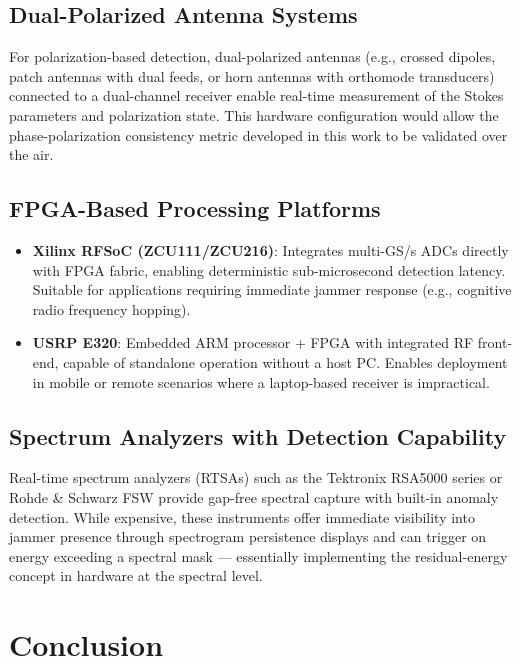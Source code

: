 \documentclass{article}
\begin{document}
\subsection{Dual-Polarized Antenna Systems}

For polarization-based detection, dual-polarized antennas (e.g., crossed dipoles, patch antennas with dual feeds, or horn antennas with orthomode transducers) connected to a dual-channel receiver enable real-time measurement of the Stokes parameters and polarization state. This hardware configuration would allow the phase-polarization consistency metric developed in this work to be validated over the air.

\subsection{FPGA-Based Processing Platforms}

\begin{itemize}
\item \textbf{Xilinx RFSoC (ZCU111/ZCU216)}: Integrates multi-GS/s ADCs directly with FPGA fabric, enabling deterministic sub-microsecond detection latency. Suitable for applications requiring immediate jammer response (e.g., cognitive radio frequency hopping).

\item \textbf{USRP E320}: Embedded ARM processor + FPGA with integrated RF front-end, capable of standalone operation without a host PC. Enables deployment in mobile or remote scenarios where a laptop-based receiver is impractical.
\end{itemize}

\subsection{Spectrum Analyzers with Detection Capability}

Real-time spectrum analyzers (RTSAs) such as the Tektronix RSA5000 series or Rohde \& Schwarz FSW provide gap-free spectral capture with built-in anomaly detection. While expensive, these instruments offer immediate visibility into jammer presence through spectrogram persistence displays and can trigger on energy exceeding a spectral mask — essentially implementing the residual-energy concept in hardware at the spectral level.


\newpage
\section{Conclusion}
\end{document}
